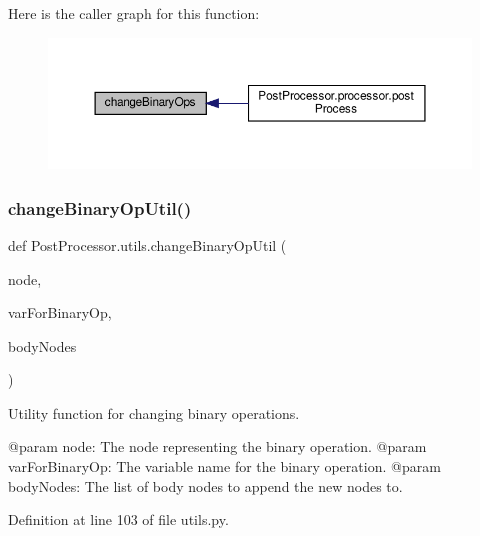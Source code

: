 Here is the caller graph for this function\+:\nopagebreak
\begin{figure}[H]
\begin{center}
\leavevmode
\includegraphics[width=350pt]{namespacePostProcessor_1_1utils_a1ea8f909bf93721481e4fd1bd3f2dff1_icgraph}
\end{center}
\end{figure}
\mbox{\label{namespacePostProcessor_1_1utils_ab12ae71cedd8ec3fcbfedd7a6dbe6599}} 
\subsubsection{\texorpdfstring{change\+Binary\+Op\+Util()}{changeBinaryOpUtil()}}
{\footnotesize\ttfamily def Post\+Processor.\+utils.\+change\+Binary\+Op\+Util (\begin{DoxyParamCaption}\item[{}]{node,  }\item[{}]{var\+For\+Binary\+Op,  }\item[{}]{body\+Nodes }\end{DoxyParamCaption})}

\begin{DoxyVerb}Utility function for changing binary operations.

@param node: The node representing the binary operation.
@param varForBinaryOp: The variable name for the binary operation.
@param bodyNodes: The list of body nodes to append the new nodes to.
\end{DoxyVerb}
 

Definition at line 103 of file utils.\+py.


